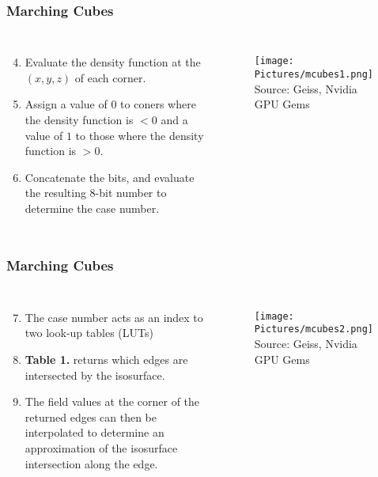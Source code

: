 \documentclass[12pt]{beamer}
\begin{document}
        \begin{frame}
            \frametitle{Marching Cubes}
            \begin{columns}[c] %

                \begin{enumerate}
                    \setcounter{enumi}{3}
                \item Evaluate the density function at the $(x,y,z)$ of each corner.
                \item Assign a value of $0$ to coners where the density function is $< 0$ and a value of $1$ to those where the density function is $>0$.
                \item Concatenate the bits, and evaluate the resulting 8-bit number to determine the case number. 
                
                \end{enumerate}

                \begin{figure}
                    \texttt{[image: Pictures/mcubes1.png]}
                    \tiny{Source: Geiss, Nvidia GPU Gems}

                \end{figure}

            \end{columns}
        \end{frame}
        \begin{frame}
            \frametitle{Marching Cubes}
            \begin{columns}[c] %

                \begin{enumerate}
                    \setcounter{enumi}{6}
                \item The case number acts as an index to two look-up tables (LUTs)
                \item \textbf{Table 1.} returns which edges are intersected by the isosurface.   
                \item The field values at the corner of the returned edges can then be interpolated to determine an approximation of the isosurface intersection along the edge.
                \end{enumerate}

                \begin{figure}
                    \texttt{[image: Pictures/mcubes2.png]}
                    \tiny{Source: Geiss, Nvidia GPU Gems}

                \end{figure}

            \end{columns}
        \end{frame}
\end{document}

